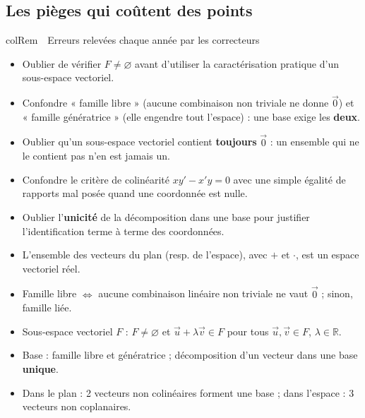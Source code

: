 \documentclass[11pt,a4paper]{article}
\newenvironment{remarque}[1][Remarque]
  {\begin{fiche}{colRem}{\ding{43}~~#1}}{\end{fiche}}
\begin{document}
\subsection{Les pièges qui coûtent des points}

\begin{remarque}[Erreurs relevées chaque année par les correcteurs]
\begin{itemize}[leftmargin=6mm, itemsep=0.5mm]
  \item Oublier de vérifier $F\ne\varnothing$ avant d'utiliser la caractérisation pratique d'un sous-espace vectoriel.
  \item Confondre « famille libre » (aucune combinaison non triviale ne donne $\vec0$) et « famille génératrice » (elle engendre tout l'espace) : une base exige les \textbf{deux}.
  \item Oublier qu'un sous-espace vectoriel contient \textbf{toujours} $\vec0$ : un ensemble qui ne le contient pas n'en est jamais un.
  \item Confondre le critère de colinéarité $xy'-x'y=0$ avec une simple égalité de rapports mal posée quand une coordonnée est nulle.
  \item Oublier l'\textbf{unicité} de la décomposition dans une base pour justifier l'identification terme à terme des coordonnées.
\end{itemize}
\end{remarque}

\vspace{4mm}
\begin{tcolorbox}[
  enhanced, boxrule=0pt, arc=2mm,
  interior style={left color=qtealdark, right color=qteal},
  left=6mm, right=6mm, top=4mm, bottom=4mm,
  fontupper=\color{white}\sffamily,
  title={\sffamily\bfseries\color{white}\ding{72}~~À retenir},
  colbacktitle=qtealdark, coltitle=white, boxrule=0pt
]
\begin{itemize}[leftmargin=6mm, label={\color{qamber}}, itemsep=1mm]
  \item L'ensemble des vecteurs du plan (resp. de l'espace), avec $+$ et $\cdot$, est un espace vectoriel réel.
  \item Famille libre $\iff$ aucune combinaison linéaire non triviale ne vaut $\vec0$ ; sinon, famille liée.
  \item Sous-espace vectoriel $F$ : $F\ne\varnothing$ et $\vec u+\lambda\vec v\in F$ pour tous $\vec u,\vec v\in F$, $\lambda\in\mathbb{R}$.
  \item Base : famille libre et génératrice ; décomposition d'un vecteur dans une base \textbf{unique}.
  \item Dans le plan : 2 vecteurs non colinéaires forment une base ; dans l'espace : 3 vecteurs non coplanaires.
\end{itemize}
\end{tcolorbox}
\end{document}
